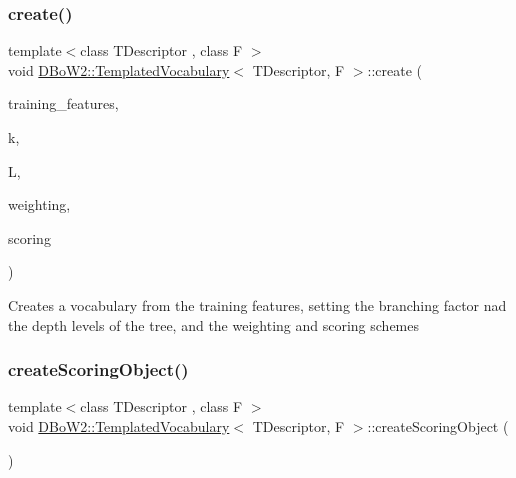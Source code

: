 \subsubsection{\texorpdfstring{create()}{create()}\hspace{0.1cm}{\footnotesize\ttfamily [3/3]}}
{\footnotesize\ttfamily template$<$class T\+Descriptor , class F $>$ \\
void \mbox{\hyperlink{class_d_bo_w2_1_1_templated_vocabulary}{D\+Bo\+W2\+::\+Templated\+Vocabulary}}$<$ T\+Descriptor, F $>$\+::create (\begin{DoxyParamCaption}\item[{const std\+::vector$<$ std\+::vector$<$ T\+Descriptor $>$ $>$ \&}]{training\+\_\+features,  }\item[{int}]{k,  }\item[{int}]{L,  }\item[{\mbox{\hyperlink{namespace_d_bo_w2_a5de5c8a307aca9a84ffefda2a9bc467a}{Weighting\+Type}}}]{weighting,  }\item[{\mbox{\hyperlink{namespace_d_bo_w2_aa252a592dd607c6e60dede06ceef2722}{Scoring\+Type}}}]{scoring }\end{DoxyParamCaption})\hspace{0.3cm}{\ttfamily [virtual]}}

Creates a vocabulary from the training features, setting the branching factor nad the depth levels of the tree, and the weighting and scoring schemes \mbox{\label{class_d_bo_w2_1_1_templated_vocabulary_a3244d5a3d0f75ba9c9ae905c5365335d}} 
\subsubsection{\texorpdfstring{create\+Scoring\+Object()}{createScoringObject()}}
{\footnotesize\ttfamily template$<$class T\+Descriptor , class F $>$ \\
void \mbox{\hyperlink{class_d_bo_w2_1_1_templated_vocabulary}{D\+Bo\+W2\+::\+Templated\+Vocabulary}}$<$ T\+Descriptor, F $>$\+::create\+Scoring\+Object (\begin{DoxyParamCaption}{ }\end{DoxyParamCaption})\hspace{0.3cm}{\ttfamily [protected]}}

